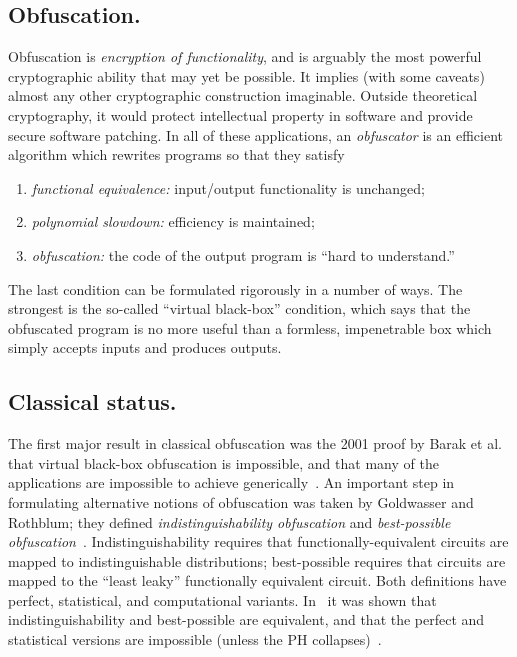 \documentclass[11pt]{amsart}
\numberwithin{equation}{section}
\begin{document}
\subsection{Obfuscation.} Obfuscation is \emph{encryption of functionality}, and is arguably the most powerful cryptographic ability that may yet be possible. It implies (with some caveats) almost any other cryptographic construction imaginable. Outside theoretical cryptography, it would protect intellectual property in software and provide secure software patching. In all of these applications, an \emph{obfuscator} is an efficient algorithm which rewrites programs so that they satisfy
\begin{enumerate}\label{def:obf-informal}
\item \emph{functional equivalence:} input/output functionality is unchanged;
\item \emph{polynomial slowdown:} efficiency is maintained;
\item \emph{obfuscation:} the code of the output program is ``hard to understand.''
\end{enumerate}
The last condition can be formulated rigorously in a number of ways. The strongest is the so-called ``virtual black-box'' condition, which says that the obfuscated program is no more useful than a formless, impenetrable box which simply accepts inputs and produces outputs. 

\subsection{Classical status.} The first major result in classical obfuscation was the 2001 proof by Barak et al. that virtual black-box obfuscation is impossible, and that many of the applications are impossible to achieve generically~\cite{BGIRSVY01, BGIRSVY12}. An important step in formulating alternative notions of obfuscation was taken by Goldwasser and Rothblum; they defined \emph{indistinguishability obfuscation} and \emph{best-possible obfuscation}~\cite{GR07}. Indistinguishability requires that functionally-equivalent circuits are mapped to indistinguishable distributions; best-possible requires that circuits are mapped to the ``least leaky'' functionally equivalent circuit. Both definitions have perfect, statistical, and computational variants. In~\cite{GR07} it was shown that indistinguishability and best-possible are equivalent, and that the perfect and statistical versions are impossible (unless the PH collapses)~\cite{GR07}. 
\end{document}
